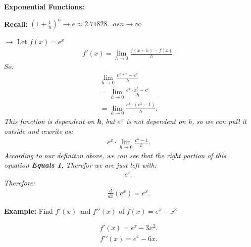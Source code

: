 \documentclass{report}
\begin{document}
  \pagebreak \bigbreak \noindent
  \begin{large}
    \textbf{Exponential Functions:}
  \end{large}

  \bigbreak \noindent \bigbreak \noindent 
  \textbf{Recall:} $(1+ \frac{1}{n})^n \rightarrow e \approx 2.71828... as n \rightarrow \infty $

  \bigbreak \noindent \bigbreak \noindent  
  \bigbreak \noindent 

  \bigbreak \noindent 
  $\rightarrow$ Let $f(x) = e^x$
  \begin{align*}
    f\prime(x) = \lim\limits_{h \to 0}{ \frac{f(x+h) - f(x)}{h}}
  .\end{align*}
  \textit{So:}
  \begin{align*}
    \lim\limits_{h \to 0}{ \frac{e^{x+h} - e^x}{h}} \\ 
    = \lim\limits_{h \to 0}{ \frac{e^x \cdot x^h - e^x} {h}} \\ 
    = \lim\limits_{h \to 0}{ \frac{e^x \cdot (e^h-1)}{h}}
  .\end{align*}
  \bigbreak \noindent 
  \textit{This function is dependent on \textbf{h}, but $e^x$ is not dependent on h, so we can pull it outside and rewrite as:}
  \begin{align*}
    e^x \cdot \lim\limits_{h \to 0}{ \frac{e^h-1}{h}}
  .\end{align*}
  \textit{According to our definiton above, we can see that the right portion of this equation \textbf{\textit{Equals 1}}, Therefor we are just left with:}
  \begin{align*}
    e^x
  .\end{align*}
  \bigbreak \noindent 
  \textit{Therefore:}
  \begin{align*}
    \frac{d}{dx}(e^x) = e^x
  .\end{align*}

  \bigbreak \noindent 
  \begin{mdframed}
    \textbf{Example:} Find $f\prime(x)$ and $f\prime\prime(x)$ of $f(x) = e^x - x^3$ 
  \end{mdframed}
  \bigbreak \noindent 
  \begin{align*}
    f\prime(x) = e^x - 3x^2
  .\end{align*}
  \bigbreak \noindent 
  \begin{align*}
    f\prime\prime(x) = e^x - 6x
  .\end{align*}
\end{document}
